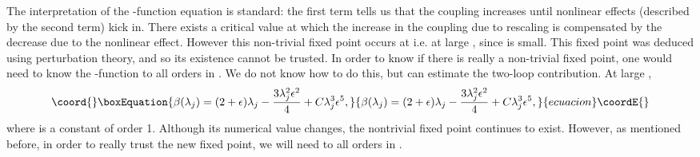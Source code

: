\documentclass[a4paper,12pt]{article}
\numberwithin{equation}{section}
\begin{document}
The interpretation of the \myHighlight{$\beta$}\coordHE{}-function equation is standard: the
first term tells us that the coupling increases until nonlinear
effects (described by the second term) kick in. There exists a
critical value \coordHE{} at which the increase in the coupling due
to rescaling is compensated by the decrease due to the nonlinear
effect. However this non-trivial fixed point occurs at \coordHE{} i.e. at large \myHighlight{$\lambda$}\coordHE{}, since \coordHE{} is small. This fixed point was deduced using perturbation theory,
and so its existence cannot be trusted. In order to know if there is
really a non-trivial fixed point, one would need to know the
\myHighlight{$\beta$}\coordHE{}-function to all orders in \myHighlight{$\lambda$}\coordHE{}. We do not know how to do
this, but can estimate the two-loop contribution. At large \coordHE{},
\begin{equation}\coord{}\boxEquation{ 
\beta(\lambda_j) = (2+\epsilon) \lambda_j - \frac{3 \lambda_j^2
\epsilon^2}{4} + C \lambda_j^3 \epsilon^5, 
}{ 
\beta(\lambda_j) = (2+\epsilon) \lambda_j - \frac{3 \lambda_j^2
\epsilon^2}{4} + C \lambda_j^3 \epsilon^5, 
}{ecuacion}\coordE{}\end{equation} 
where \coordHE{} is a constant of order 1. Although its numerical value
changes, the nontrivial fixed point continues to exist. However, as
mentioned before, in order to really trust the new fixed point, we
will need \coordHE{} to all orders in \coordHE{}.
\end{document}
